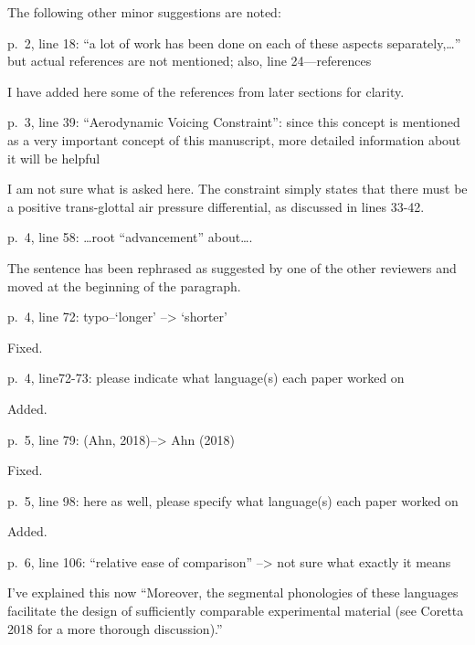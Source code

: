 \documentclass[]{article}
\begin{document}
The following other minor suggestions are noted:

p.~2, line 18: ``a lot of work has been done on each of these aspects
separately,\ldots{}'' but actual references are not mentioned; also,
line 24---references

\color{plum}

I have added here some of the references from later sections for
clarity. \color{black}

p.~3, line 39: ``Aerodynamic Voicing Constraint'': since this concept is
mentioned as a very important concept of this manuscript, more detailed
information about it will be helpful

\color{plum}

I am not sure what is asked here. The constraint simply states that
there must be a positive trans-glottal air pressure differential, as
discussed in lines 33-42. \color{black}

p.~4, line 58: \ldots{}root ``advancement'' about\ldots{}.

\color{plum}

The sentence has been rephrased as suggested by one of the other
reviewers and moved at the beginning of the paragraph. \color{black}

p.~4, line 72: typo--`longer' --\textgreater{} `shorter'

\color{plum}

Fixed. \color{black}

p.~4, line72-73: please indicate what language(s) each paper worked on

\color{plum}

Added. \color{black}

p.~5, line 79: (Ahn, 2018)--\textgreater{} Ahn (2018)

\color{plum}

Fixed. \color{black}

p.~5, line 98: here as well, please specify what language(s) each paper
worked on

\color{plum}

Added. \color{black}

p.~6, line 106: ``relative ease of comparison'' --\textgreater{} not
sure what exactly it means

\color{plum}

I've explained this now ``Moreover, the segmental phonologies of these
languages facilitate the design of sufficiently comparable experimental
material (see Coretta 2018 for a more thorough discussion).''
\color{black}
\end{document}
